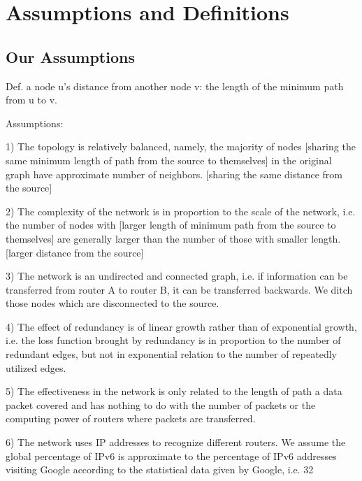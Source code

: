\documentclass{mcmthesis}
\begin{document}
\section{Assumptions and Definitions}
\subsection{Our Assumptions}

Def. a node u's distance from another node v: the length of the minimum path from u to v.

Assumptions:

1) The topology is relatively balanced, namely, the majority of nodes [sharing the same minimum length of path from the source to themselves] in the original graph have approximate number of neighbors.
[sharing the same distance from the source]

2) The complexity of the network is in proportion to the scale of the network, i.e. the number of nodes with [larger length of minimum path from the source to themselves] are generally larger than the number of those with smaller length.
[larger distance from the source]

3) The network is an undirected and connected graph, i.e. if information can be transferred from router A to router B, it can be transferred backwards. We ditch those nodes which are disconnected to the source.

4) The effect of redundancy is of linear growth rather than of exponential growth, i.e. the loss function brought by redundancy is in proportion to the number of redundant edges, but not in exponential relation to the number of repeatedly utilized edges.

5) The effectiveness in the network is only related to the length of path a data packet covered and has nothing to do with the number of packets or the computing power of routers where packets are transferred.

6) The network uses IP addresses to recognize different routers. We assume the global percentage of IPv6 is approximate to the percentage of IPv6 addresses visiting Google according to the statistical data given by Google, i.e. 32%
\end{document}
